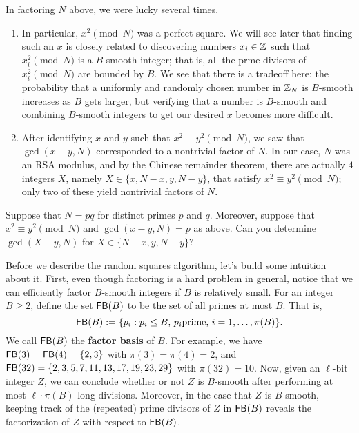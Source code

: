 In factoring $N$ above, we were lucky several times. 
\begin{enumerate}[(1)]
    \item In particular, $x^2 \pmod N$ was a perfect square. We will see later 
    that finding such an $x$ is closely related to discovering numbers 
    $x_i \in \mathbb{Z}$ such that $x_i^2 \pmod N$ is a $B$-smooth integer; that is, 
    all the prme divisors of $x_i^2 \pmod N$ are bounded by $B$. We see that 
    there is a tradeoff here: the probability that a uniformly and randomly 
    chosen number in $\mathbb{Z}_N$ is $B$-smooth increases as $B$ gets larger, 
    but verifying that a number is $B$-smooth and combining $B$-smooth 
    integers to get our desired $x$ becomes more difficult.
    \item After identifying $x$ and $y$ such that $x^2 \equiv y^2 \pmod N$, 
    we saw that $\gcd(x-y, N)$ corresponded to a nontrivial factor of $N$. 
    In our case, $N$ was an RSA modulus, and by the Chinese remainder theorem, 
    there are actually $4$ integers $X$, namely $X \in \{x, N-x, y, N-y\}$, 
    that satisfy $x^2 \equiv y^2 \pmod N$; only two of these yield 
    nontrivial factors of $N$. 
\end{enumerate}

\begin{exercise}
    Suppose that $N = pq$ for distinct primes $p$ and $q$. Moreover, suppose 
    that $x^2 \equiv y^2 \pmod N$ and $\gcd(x-y, N) = p$ as above. Can you 
    determine $\gcd(X-y, N)$ for $X \in \{N-x, y, N-y\}$?
\end{exercise}

Before we describe the random squares algorithm, let's build some 
intuition about it. First, even though factoring is a hard problem in 
general, notice that we can efficiently factor $B$-smooth integers if 
$B$ is relatively small. For an integer $B \geq 2$, define the set 
${\sf FB}(B)$ to be the set of all primes at most $B$. That is, 
\[ {\sf FB}(B) := \{p_i : p_i \leq B,\, p_i \text{prime},\, i = 1, \dots, \pi(B)\}. \] 
We call ${\sf FB}(B)$ the {\bf factor basis} of $B$. For example, we have 
${\sf FB}(3) = {\sf FB}(4) = \{2, 3\}$ with $\pi(3) = \pi(4) = 2$, and 
${\sf FB}(32) = \{2, 3, 5, 7, 11, 13, 17, 19, 23, 29\}$ with $\pi(32) = 10$. 
Now, given an $\ell$-bit integer $Z$, we can conclude whether or not 
$Z$ is $B$-smooth after performing at most $\ell \cdot \pi(B)$ long divisions. 
Moreover, in the case that $Z$ is $B$-smooth, keeping track of the 
(repeated) prime divisors of $Z$ in ${\sf FB}(B)$ reveals the factorization of 
$Z$ with respect to ${\sf FB}(B)$. 

